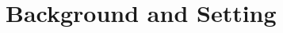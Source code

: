 \documentclass[11pt,a4paper,oneside]{article}
\begin{document}



\section{Background and Setting} \label{s2}
\end{document}
